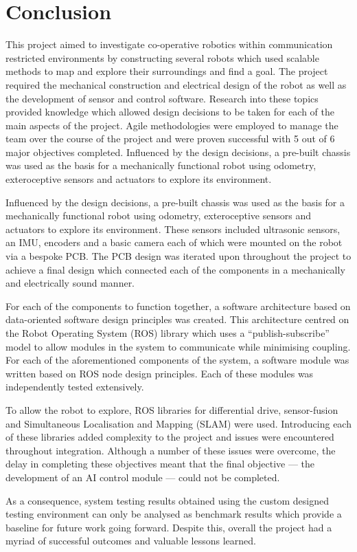 
\chapter{Conclusion}\label{conclusion}
This project aimed to investigate co-operative robotics within 
communication restricted environments by constructing several robots 
which used scalable methods to map and explore their surroundings and find 
a goal. The project required the mechanical construction and 
electrical design of the robot as well as the development of sensor and 
control software.  Research into these topics provided knowledge which 
allowed 
design decisions to be taken for each of the main aspects of the project. 
Agile methodologies were employed to manage the team over the course of 
the project and were proven successful with 5 out of 6 major objectives 
completed. Influenced by the design decisions, a pre-built chassis was 
used as the basis for a mechanically functional robot using odometry, 
exteroceptive sensors and actuators to explore its environment. 


Influenced by the design decisions, a pre-built chassis was 
used as the basis for a mechanically functional robot using odometry, 
exteroceptive sensors and actuators to explore its environment. These sensors included ultrasonic sensors, an IMU, encoders and a basic 
camera each of which were mounted on the robot via a bespoke PCB. The PCB 
design was iterated upon throughout the project to achieve a final design 
which connected each of the components in a mechanically and 
electrically sound manner. 

For each of the components to function together, a software 
architecture based on data-oriented software design principles was 
created. This architecture centred on the Robot Operating System (ROS) 
library which uses a ``publish-subscribe'' model to allow modules in the 
system to communicate while minimising coupling. For each of the aforementioned components of the 
system, a software module was written based on ROS node design principles. 
Each of these modules was independently tested extensively. 

To allow the robot to explore, ROS libraries for differential drive, 
sensor-fusion and Simultaneous Localisation and Mapping (SLAM) were used. 
Introducing each of these libraries added complexity to the project and 
issues were encountered throughout integration. Although a number of these 
issues were overcome, the delay in completing these objectives meant that 
the final objective --- the development of an AI control module --- could not 
be completed. 

As a consequence, system testing results obtained using the custom designed testing environment can only be analysed as 
benchmark results which provide a baseline for future work going forward. 
Despite this, overall the project had a myriad of successful outcomes and 
valuable lessons learned.      
